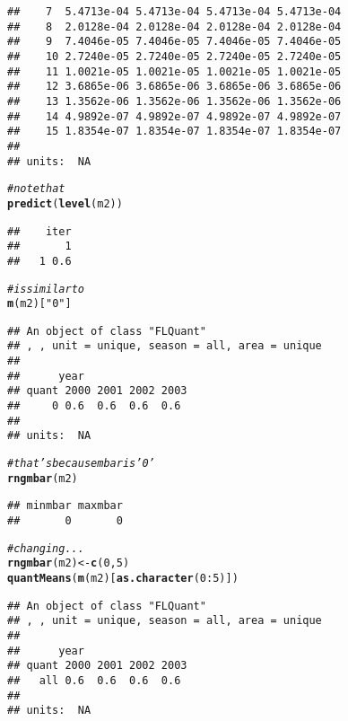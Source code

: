 \documentclass[a4paper,english,10pt]{article}\usepackage[]{graphicx}\usepackage[]{color}
\makeatletter
\newcommand{\hlnum}[1]{\textcolor[rgb]{0.686,0.059,0.569}{#1}}%
\newcommand{\hlstr}[1]{\textcolor[rgb]{0.192,0.494,0.8}{#1}}%
\newcommand{\hlcom}[1]{\textcolor[rgb]{0.678,0.584,0.686}{\textit{#1}}}%
\newcommand{\hlopt}[1]{\textcolor[rgb]{0,0,0}{#1}}%
\newcommand{\hlstd}[1]{\textcolor[rgb]{0.345,0.345,0.345}{#1}}%
\newcommand{\hlkwb}[1]{\textcolor[rgb]{0.69,0.353,0.396}{#1}}%
\newcommand{\hlkwd}[1]{\textcolor[rgb]{0.737,0.353,0.396}{\textbf{#1}}}%
\newenvironment{kframe}{%
 \def\at@end@of@kframe{}%
 \ifinner\ifhmode%
  \def\at@end@of@kframe{\end{minipage}}%
  \begin{minipage}{\columnwidth}%
 \fi\fi%
 \def\FrameCommand##1{\hskip\@totalleftmargin \hskip-\fboxsep
 \colorbox{shadecolor}{##1}\hskip-\fboxsep
     \hskip-\linewidth \hskip-\@totalleftmargin \hskip\columnwidth}%
 \MakeFramed {\advance\hsize-\width
   \@totalleftmargin\z@ \linewidth\hsize
   \@setminipage}}%
 {\par\unskip\endMakeFramed%
 \at@end@of@kframe}
\newenvironment{knitrout}{}{} %
\makeatother
\begin{document}
\begin{knitrout}
\begin{kframe}
\begin{verbatim}
##    7  5.4713e-04 5.4713e-04 5.4713e-04 5.4713e-04
##    8  2.0128e-04 2.0128e-04 2.0128e-04 2.0128e-04
##    9  7.4046e-05 7.4046e-05 7.4046e-05 7.4046e-05
##    10 2.7240e-05 2.7240e-05 2.7240e-05 2.7240e-05
##    11 1.0021e-05 1.0021e-05 1.0021e-05 1.0021e-05
##    12 3.6865e-06 3.6865e-06 3.6865e-06 3.6865e-06
##    13 1.3562e-06 1.3562e-06 1.3562e-06 1.3562e-06
##    14 4.9892e-07 4.9892e-07 4.9892e-07 4.9892e-07
##    15 1.8354e-07 1.8354e-07 1.8354e-07 1.8354e-07
## 
## units:  NA
\end{verbatim}
\begin{alltt}
\hlcom{# note that}
\hlkwd{predict}\hlstd{(}\hlkwd{level}\hlstd{(m2))}
\end{alltt}
\begin{verbatim}
##    iter
##       1
##   1 0.6
\end{verbatim}
\begin{alltt}
\hlcom{# is similar to}
\hlkwd{m}\hlstd{(m2)[}\hlstr{"0"}\hlstd{]}
\end{alltt}
\begin{verbatim}
## An object of class "FLQuant"
## , , unit = unique, season = all, area = unique
## 
##      year
## quant 2000 2001 2002 2003
##     0 0.6  0.6  0.6  0.6 
## 
## units:  NA
\end{verbatim}
\begin{alltt}
\hlcom{# that's because mbar is '0'}
\hlkwd{rngmbar}\hlstd{(m2)}
\end{alltt}
\begin{verbatim}
## minmbar maxmbar 
##       0       0
\end{verbatim}
\begin{alltt}
\hlcom{# changing ...}
\hlkwd{rngmbar}\hlstd{(m2)} \hlkwb{<-} \hlkwd{c}\hlstd{(}\hlnum{0}\hlstd{,} \hlnum{5}\hlstd{)}
\hlkwd{quantMeans}\hlstd{(}\hlkwd{m}\hlstd{(m2)[}\hlkwd{as.character}\hlstd{(}\hlnum{0}\hlopt{:}\hlnum{5}\hlstd{)])}
\end{alltt}
\begin{verbatim}
## An object of class "FLQuant"
## , , unit = unique, season = all, area = unique
## 
##      year
## quant 2000 2001 2002 2003
##   all 0.6  0.6  0.6  0.6 
## 
## units:  NA
\end{verbatim}
\end{kframe}
\end{knitrout}
\end{document}
